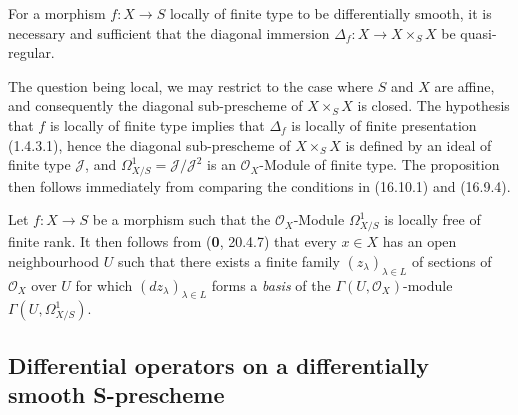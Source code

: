 \begin{proposition}[16.10.5]
\label{IV.16.10.5}
For a morphism $f:X\to S$ locally of finite type to be
differentially smooth, it is necessary and sufficient that the diagonal
immersion $\Delta_f:X\to X\times_S X$ be quasi-regular.
\end{proposition}


The question being local, we may restrict to the case where $S$ and $X$ are
affine, and consequently the diagonal sub-prescheme of $X\times_S X$ is
closed. The hypothesis that $f$ is locally of finite type implies that
$\Delta_f$ is locally of finite presentation (1.4.3.1), hence the diagonal
sub-prescheme of $X\times_S X$ is defined by an ideal of finite type
$\mathscr{J}$, and $\varOmega_{X/S}^1=\mathscr{J}/\mathscr{J}^2$ is an
$\mathcal{O}_X$-Module of finite type. The proposition then follows
immediately from comparing the conditions in (16.10.1) and (16.9.4).

\begin{remark}[16.10.6]
\label{IV.16.10.6}
Let $f:X\to S$ be a morphism such that the $\mathcal{O}_X$-Module
$\varOmega_{X/S}^1$ is locally free of finite rank. It then follows from
(\textbf{0}, 20.4.7) that every $x\in X$ has an open neighbourhood $U$ such that there
exists a finite family $(z_\lambda)_{\lambda\in L}$ of sections of
$\mathcal{O}_X$ over $U$ for which $(dz_\lambda)_{\lambda\in L}$
forms a \emph{basis} of the $\Gamma(U,\mathcal{O}_X)$-module
$\Gamma(U,\varOmega_{X/S}^1)$.
\end{remark}

\subsection{\texorpdfstring{Differential operators on a differentially smooth
S-prescheme}{Differential operators on a differentially smooth S-prescheme}}

